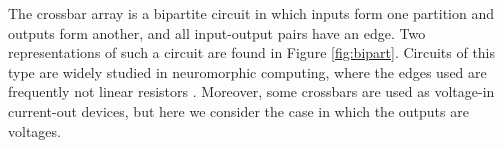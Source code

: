\documentclass[final, 11pt, nonatbib]{elsarticle}
\theoremstyle{definition}
\theoremstyle{plain}
\newcommand{\AGK}{\color{blue}}
\numberwithin{equation}{section}
\begin{document}








The crossbar array is a bipartite circuit in which inputs form one partition and outputs form another, and all input-output pairs have an edge. Two representations of such a circuit are found in Figure \ref{fig:bipart}. Circuits of this type are widely studied in neuromorphic computing, where the edges used are frequently not linear resistors \cite{xiaMemristiveCrossbarArrays2019}. Moreover, some crossbars are used as voltage-in current-out devices, but here we consider the case in which the outputs are voltages. 
\end{document}
